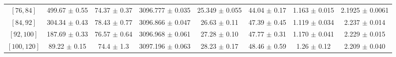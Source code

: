 \begin{tabular}{c||c|c|c|c|c|c|c}
$[76, 84]$ & 499.67 $\pm$ 0.55 & 74.37 $\pm$ 0.37 & 3096.777 $\pm$ 0.035 & 25.349 $\pm$ 0.055 & 44.04 $\pm$ 0.17 & 1.163 $\pm$ 0.015 & 2.1925 $\pm$ 0.0061\\
$[84, 92]$ & 304.34 $\pm$ 0.43 & 78.43 $\pm$ 0.77 & 3096.866 $\pm$ 0.047 & 26.63 $\pm$ 0.11 & 47.39 $\pm$ 0.45 & 1.119 $\pm$ 0.034 & 2.237 $\pm$ 0.014\\
$[92, 100]$ & 187.69 $\pm$ 0.33 & 76.57 $\pm$ 0.64 & 3096.968 $\pm$ 0.061 & 27.28 $\pm$ 0.10 & 47.77 $\pm$ 0.31 & 1.170 $\pm$ 0.041 & 2.229 $\pm$ 0.015\\
$[100, 120]$ & 89.22 $\pm$ 0.15 & 74.4 $\pm$ 1.3 & 3097.196 $\pm$ 0.063 & 28.23 $\pm$ 0.17 & 48.46 $\pm$ 0.59 & 1.26 $\pm$ 0.12 & 2.209 $\pm$ 0.040\\
\end{tabular}
